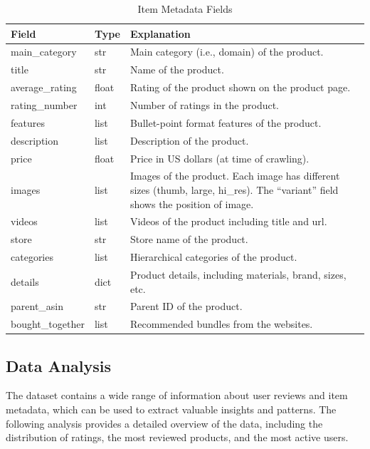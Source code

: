 \documentclass[11pt,a4paper,openany,oneside,titlepage]{article}
\begin{document}
\begin{table}[h!]
  \centering
  \begin{tabular}{|l|l|p{8cm}|}
  \hline
  \textbf{Field} & \textbf{Type} & \textbf{Explanation} \\ \hline
  main\_category & str & Main category (i.e., domain) of the product. \\ \hline
  title & str & Name of the product. \\ \hline
  average\_rating & float & Rating of the product shown on the product page. \\ \hline
  rating\_number & int & Number of ratings in the product. \\ \hline
  features & list & Bullet-point format features of the product. \\ \hline
  description & list & Description of the product. \\ \hline
  price & float & Price in US dollars (at time of crawling). \\ \hline
  images & list & Images of the product. Each image has different sizes (thumb, large, hi\_res). The ``variant'' field shows the position of image. \\ \hline
  videos & list & Videos of the product including title and url. \\ \hline
  store & str & Store name of the product. \\ \hline
  categories & list & Hierarchical categories of the product. \\ \hline
  details & dict & Product details, including materials, brand, sizes, etc. \\ \hline
  parent\_asin & str & Parent ID of the product. \\ \hline
  bought\_together & list & Recommended bundles from the websites. \\ \hline
  \end{tabular}
  \caption{Item Metadata Fields}
  \label{table:item_metadata}
  \end{table}

\subsection{Data Analysis}

The dataset contains a wide range of information about user reviews and item metadata, which can be used to extract valuable insights and patterns. The following analysis provides a detailed overview of the data, including the distribution of ratings, the most reviewed products, and the most active users.
\end{document}
